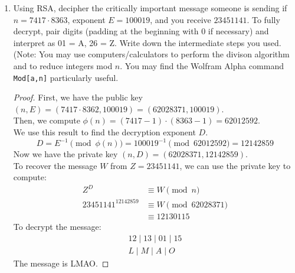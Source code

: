 \documentclass[11pt]{article}
\theoremstyle{definition}
\begin{document}
\begin{enumerate}
    \item Using RSA, decipher the critically important message someone is sending if $n =7417\cdot 8363$, exponent $E = 100019$, and you receive $23451141$. To fully decrypt, pair digits (padding at the beginning with 0 if necessary) and interpret as 01 = A, 26 = Z. Write down the intermediate steps you used. (Note: You may use computers/calculators to perform the divison algorithm and to reduce integers mod $n$. You may find the Wolfram Alpha command \texttt{Mod[a,n]} particularly useful.
    \begin{proof}
        First, we have the public key $(n,E) = (7417\cdot 8362,100019) = (62028371,100019)$. \\
        Then, we compute $\phi(n) = (7417-1)\cdot (8363-1) = 62012592$. \\
        We use this result to find the decryption exponent $D$.
        \[
            D = E^{-1}\pmod{\phi(n)} = 100019^{-1}\pmod{62012592} = 12142859
        \]
        Now we have the private key $(n,D) = (62028371,12142859)$. \\
        To recover the message $W$ from $Z=23451141$, we can use the private key to compute:
        \begin{align*}
            Z^D &\equiv W\pmod{n} \\
            23451141^{12142859} &\equiv W\pmod{62028371} \\
            &\equiv 12130115 
        \end{align*}
        To decrypt the message:
        \begin{align*}
            12\mid 13\mid 01\mid 15 \\
            L\mid M\mid A\mid O
        \end{align*} 
        The message is LMAO.
    \end{proof}

\end{enumerate}
\end{document}
